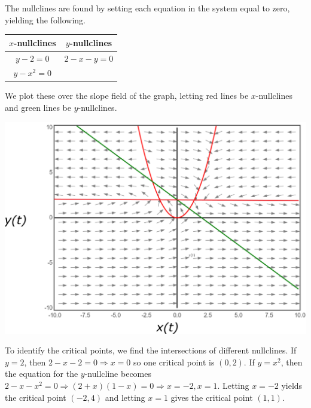\documentclass[11pt, titlepage]{article}
\begin{document}
\begin{enumerate}
            \begin{solution}
                The nullclines are found by setting each equation in the system
                equal to zero, yielding the following.
                \begin{center}
                    \begin{tabular}{ c | c }
                        $x$-nullclines & $y$-nullclines \\
                        \hline
                        $y - 2 = 0$ & $2 - x - y = 0$ \\
                        $y - x^2 = 0$ & \text{}
                    \end{tabular}
                \end{center}
                We plot these over the slope field of the graph, letting red
                lines be $x$-nullclines and green lines be $y$-nullclines.
                \begin{center}
                    \includegraphics[scale=0.5]{media/image12.png}
                \end{center}

                To identify the critical points, we find the intersections of
                different nullclines. If $y = 2$, then $2 - x - 2 = 0
                \Longrightarrow x = 0$ so one critical point is $(0, 2)$. If $y
                = x^2$, then the equation for the $y$-nullcline becomes $2 - x -
                x^2 = 0 \Longrightarrow (2 + x)(1 - x) = 0 \Longrightarrow x =
                -2, x = 1$. Letting $x = -2$ yields the critical point $(-2,
                4)$ and letting $x = 1$ gives the critical point $(1, 1)$.


\end{solution}
\end{enumerate}
\end{document}
